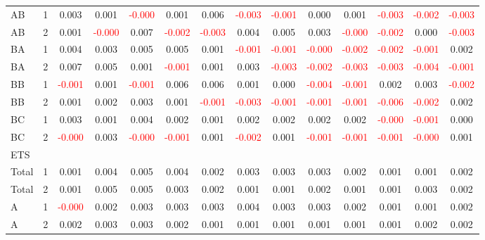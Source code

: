 \begin{table}[!htb]
{\begin{tabular}{llcccccccccccc}
AB & 1 & 0.003 & 0.001 & \textcolor{red}{-0.000} & 0.001 & 0.006 & \textcolor{red}{-0.003} & \textcolor{red}{-0.001} & 0.000 & 0.001 & \textcolor{red}{-0.003} & \textcolor{red}{-0.002} & \textcolor{red}{-0.003}\\
AB & 2 & 0.001 & \textcolor{red}{-0.000} & 0.007 & \textcolor{red}{-0.002} & \textcolor{red}{-0.003} & 0.004 & 0.005 & 0.003 & \textcolor{red}{-0.000} & \textcolor{red}{-0.002} & 0.000 & \textcolor{red}{-0.003}\\
BA & 1 & 0.004 & 0.003 & 0.005 & 0.005 & 0.001 & \textcolor{red}{-0.001} & \textcolor{red}{-0.001} & \textcolor{red}{-0.000} & \textcolor{red}{-0.002} & \textcolor{red}{-0.002} & \textcolor{red}{-0.001} & 0.002\\
BA & 2 & 0.007 & 0.005 & 0.001 & \textcolor{red}{-0.001} & 0.001 & 0.003 & \textcolor{red}{-0.003} & \textcolor{red}{-0.002} & \textcolor{red}{-0.003} & \textcolor{red}{-0.003} & \textcolor{red}{-0.004} & \textcolor{red}{-0.001}\\
BB & 1 & \textcolor{red}{-0.001} & 0.001 & \textcolor{red}{-0.001} & 0.006 & 0.006 & 0.001 & 0.000 & \textcolor{red}{-0.004} & \textcolor{red}{-0.001} & 0.002 & 0.003 & \textcolor{red}{-0.002}\\
BB & 2 & 0.001 & 0.002 & 0.003 & 0.001 & \textcolor{red}{-0.001} & \textcolor{red}{-0.003} & \textcolor{red}{-0.001} & \textcolor{red}{-0.001} & \textcolor{red}{-0.001} & \textcolor{red}{-0.006} & \textcolor{red}{-0.002} & 0.002\\
BC & 1 & 0.003 & 0.001 & 0.004 & 0.002 & 0.001 & 0.002 & 0.002 & 0.002 & 0.002 & \textcolor{red}{-0.000} & \textcolor{red}{-0.001} & 0.000\\
BC & 2 & \textcolor{red}{-0.000} & 0.003 & \textcolor{red}{-0.000} & \textcolor{red}{-0.001} & 0.001 & \textcolor{red}{-0.002} & 0.001 & \textcolor{red}{-0.001} & \textcolor{red}{-0.001} & \textcolor{red}{-0.001} & \textcolor{red}{-0.000} & 0.001\\
\hline
ETS &  &  &  &  &  &  &  &  &  &  &  &  & \\
\hline
Total & 1 & 0.001 & 0.004 & 0.005 & 0.004 & 0.002 & 0.003 & 0.003 & 0.003 & 0.002 & 0.001 & 0.001 & 0.002\\
Total & 2 & 0.001 & 0.005 & 0.005 & 0.003 & 0.002 & 0.001 & 0.001 & 0.002 & 0.001 & 0.001 & 0.003 & 0.002\\
A & 1 & \textcolor{red}{-0.000} & 0.002 & 0.003 & 0.003 & 0.003 & 0.004 & 0.003 & 0.003 & 0.002 & 0.001 & 0.001 & 0.002\\
A & 2 & 0.002 & 0.003 & 0.003 & 0.002 & 0.001 & 0.001 & 0.001 & 0.001 & 0.001 & 0.001 & 0.002 & 0.002\\

\end{tabular}}
\end{table}

